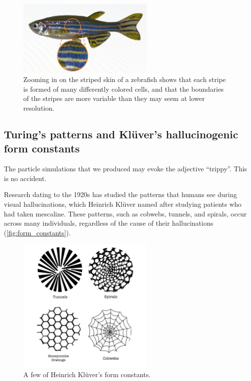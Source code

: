 \begin{figure}[h]
\centering
\mySfFamily
\includegraphics[width = 0.6\textwidth]{../images/zebrafish_zoom.jpg}
\caption{Zooming in on the striped skin of a zebrafish shows that each stripe is formed of many differently colored cells, and that the boundaries of the stripes are more variable than they may seem at lower resolution.}
\label{fig:zebrafish_zoom}
\end{figure}

\FloatBarrier
{}
\subsection{Turing's patterns and Klüver's hallucinogenic form constants}

The particle simulations that we produced may evoke the adjective ``trippy''. This is no accident.

Research dating to the 1920s has studied the patterns that humans see during visual hallucinations, which Heinrich Klüver named  after studying patients who had taken mescaline. These patterns, such as cobwebs, tunnels, and spirals, occur across many individuals, regardless of the cause of their hallucinations (\autoref{fig:form_constants}).\\

\begin{figure}[h]
\centering
\mySfFamily
\includegraphics[width = 0.6\textwidth]{../images/form_constants.png}
\caption{A few of Heinrich Klüver's form constants.}
\label{fig:form_constants}
\end{figure}

